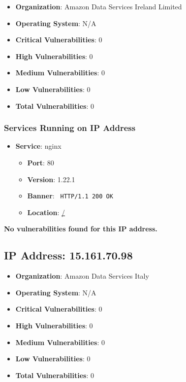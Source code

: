 \documentclass{article}
\begin{document}
\begin{itemize}
    \item \textbf{Organization}: Amazon Data Services Ireland Limited
    \item \textbf{Operating System}:  N/A 
    \item \textbf{Critical Vulnerabilities}: 0
    \item \textbf{High Vulnerabilities}: 0
    \item \textbf{Medium Vulnerabilities}: 0
    \item \textbf{Low Vulnerabilities}: 0
    \item \textbf{Total Vulnerabilities}: 0
\end{itemize}

\subsubsection*{Services Running on IP Address}

\begin{itemize}
    
        \item \textbf{Service}: nginx
        \begin{itemize}
            \item \textbf{Port}: 80
            \item \textbf{Version}:  1.22.1 
            \item \textbf{Banner}: \texttt{ HTTP/1.1 200 OK
 }
            \item \textbf{Location}: \href{ / }{ / }
        \end{itemize}
    
\end{itemize}


\textbf{No vulnerabilities found for this IP address.}


\clearpage



\subsection*{IP Address: 15.161.70.98}

\begin{itemize}
    \item \textbf{Organization}: Amazon Data Services Italy
    \item \textbf{Operating System}:  N/A 
    \item \textbf{Critical Vulnerabilities}: 0
    \item \textbf{High Vulnerabilities}: 0
    \item \textbf{Medium Vulnerabilities}: 0
    \item \textbf{Low Vulnerabilities}: 0
    \item \textbf{Total Vulnerabilities}: 0
\end{itemize}
\end{document}
